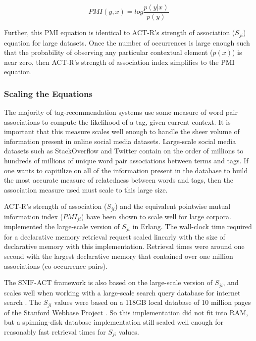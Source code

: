 \documentclass[man,floatsintext]{apa6}
\begin{document}
\begin{equation}
  \label{eqPMI}
  \mathit{PMI}(y,x) = log \frac{p(y|x)}{p(y)}
\end{equation}

Further, this PMI equation is identical to ACT-R's strength of association ($S_{ji}$) equation for large datasets.
Once the number of occurrences is large enough such that the probability of observing any particular contextual element ($p(x)$) is near zero, then ACT-R's strength of association index simplifies to the PMI equation.

\subsubsection{Scaling the Equations}

The majority of tag-recommendation systems use some measure of word pair associations to compute the likelihood of a tag, given current context.
It is important that this measure scales well enough to handle the sheer volume of information present in online social media datasets.
Large-scale social media datasets such as StackOverflow and Twitter contain on the order of millions to hundreds of millions of unique word pair associations between terms and tags.
If one wants to capitilize on all of the information present in the database to build the most accurate measure of relatedness between words and tags, then the association measure used must scale to this large size.

ACT-R's strength of association ($S_{ji}$) and the equivalent pointwise mutual information index ($\mathit{PMI}_{ji}$) have been shown to scale well for large corpora.
\textcite{Douglass2010} implemented the large-scale version of $S_{ji}$ in Erlang.
The wall-clock time required for a declarative memory retrieval request scaled linearly with the size of declarative memory with this implementation.
Retrieval times were around one second with the largest declarative memory that contained over one million associations (co-occurrence pairs).

The SNIF-ACT framework is also based on the large-scale version of $S_{ji}$, and scales well when working with a large-scale search query database for internet search \parencites{Fu2007,Pirolli2003}.
The $S_{ji}$ values were based on a 118GB local database of 10 million pages of the Stanford Webbase Project \parencite{Farahat2004}.
So this implementation did not fit into RAM, but a spinning-disk database implementation still scaled well enough for reasonably fast retrieval times for $S_{ji}$ values.
\end{document}

